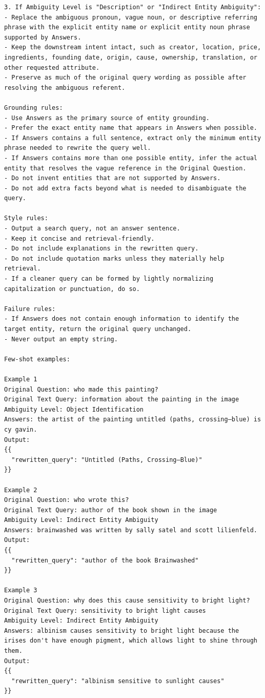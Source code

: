 \begin{verbatim}
3. If Ambiguity Level is "Description" or "Indirect Entity Ambiguity":
- Replace the ambiguous pronoun, vague noun, or descriptive referring phrase with the explicit entity name or explicit entity noun phrase supported by Answers.
- Keep the downstream intent intact, such as creator, location, price, ingredients, founding date, origin, cause, ownership, translation, or other requested attribute.
- Preserve as much of the original query wording as possible after resolving the ambiguous referent.

Grounding rules:
- Use Answers as the primary source of entity grounding.
- Prefer the exact entity name that appears in Answers when possible.
- If Answers contains a full sentence, extract only the minimum entity phrase needed to rewrite the query well.
- If Answers contains more than one possible entity, infer the actual entity that resolves the vague reference in the Original Question.
- Do not invent entities that are not supported by Answers.
- Do not add extra facts beyond what is needed to disambiguate the query.

Style rules:
- Output a search query, not an answer sentence.
- Keep it concise and retrieval-friendly.
- Do not include explanations in the rewritten query.
- Do not include quotation marks unless they materially help retrieval.
- If a cleaner query can be formed by lightly normalizing capitalization or punctuation, do so.

Failure rules:
- If Answers does not contain enough information to identify the target entity, return the original query unchanged.
- Never output an empty string.

Few-shot examples:

Example 1
Original Question: who made this painting?
Original Text Query: information about the painting in the image
Ambiguity Level: Object Identification
Answers: the artist of the painting untitled (paths, crossing—blue) is cy gavin.
Output:
{{
  "rewritten_query": "Untitled (Paths, Crossing—Blue)"
}}

Example 2
Original Question: who wrote this?
Original Text Query: author of the book shown in the image
Ambiguity Level: Indirect Entity Ambiguity
Answers: brainwashed was written by sally satel and scott lilienfeld.
Output:
{{
  "rewritten_query": "author of the book Brainwashed"
}}

Example 3
Original Question: why does this cause sensitivity to bright light?
Original Text Query: sensitivity to bright light causes
Ambiguity Level: Indirect Entity Ambiguity
Answers: albinism causes sensitivity to bright light because the irises don't have enough pigment, which allows light to shine through them.
Output:
{{
  "rewritten_query": "albinism sensitive to sunlight causes"
}}


\end{verbatim}
